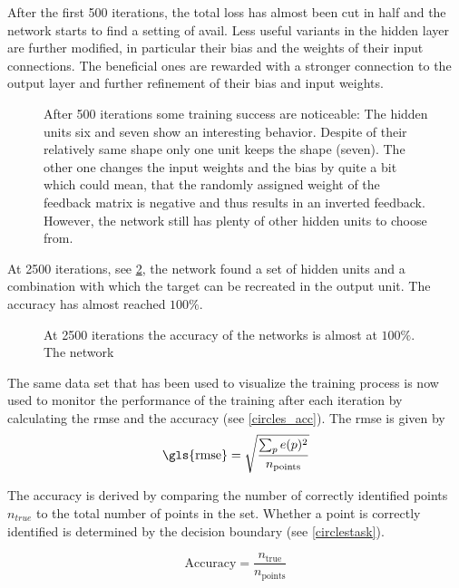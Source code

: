  After the first 500 iterations, the total loss has almost been cut in half and the network starts to find a setting of avail. Less useful variants in the hidden layer are further modified, in particular their bias and the weights of their input connections. The beneficial ones are rewarded with a stronger connection to the output layer and further refinement of their bias and input weights.

\begin{figure}
	\label{learning_process_s500}
	
	\caption{After 500 iterations some training success are noticeable: The hidden units six and seven show an interesting behavior. Despite of their relatively same shape only one unit keeps the shape (seven). The other one changes the input weights and the bias by quite a bit which could mean, that the randomly assigned weight of the feedback matrix is negative and thus results in an inverted feedback. However, the network still has plenty of other hidden units to choose from.}
\end{figure}

At 2500 iterations, see \cref{learning_process_s2500}, the network found a set of hidden units and a combination with which the target can be recreated in the output unit. The accuracy has almost reached $100 \%$.

\begin{figure}
	\label{learning_process_s2500}
	
	\caption{At 2500 iterations the accuracy of the networks is almost at $100 \%$. The network}
\end{figure}

The same data set that has been used to visualize the training process is now used to monitor the  performance of the training after each iteration by calculating the \gls{rmse} and the accuracy (see \cref{circles_acc}). The \gls{rmse} is given by
\begin{equation}
	\text{\gls{rmse}} = \sqrt{\frac{\sum_p e(p)^2}{n_\text{points}}}
\end{equation}

The accuracy is derived by comparing the number of correctly identified points $n_{true}$ to the total number of points in the set. Whether a point is correctly identified is determined by the decision boundary (see \cref{circlestask}).

\begin{equation}
\text{Accuracy} = \frac{n_\text{true}}{n_\text{points}}
\end{equation}

